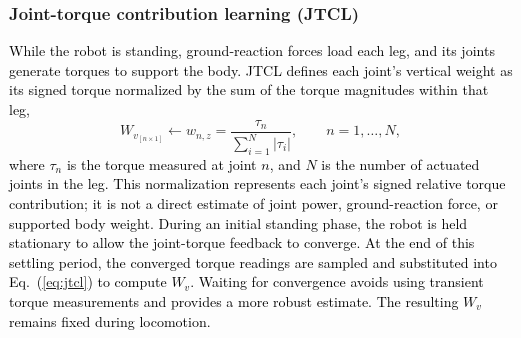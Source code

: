 \documentclass[a4paper, 10pt, conference]{ieeeconf}
\newcommand{\oldtext}[1]{\textcolor{red}{}}
\newcommand{\newtext}[1]{\textcolor{black}{#1}}
\begin{document}
\subsubsection{Joint-torque contribution learning (JTCL)}
\newtext{While the robot is standing, ground-reaction forces load each leg, and
its joints generate torques to support the body. JTCL defines each joint's
vertical weight as its signed torque normalized by the sum of the torque
magnitudes within that leg,}
{\color{black}
\begin{equation}
  W_{v_{[n\times1]}} \leftarrow w_{n,z}
    = \frac{\tau_n}{\sum_{i=1}^{N}|\tau_i|},
    \qquad n=1,\ldots,N,
  \label{eq:jtcl}
\end{equation}
}
\newtext{where $\tau_n$ is the torque measured at joint $n$, and $N$ is the
number of actuated joints in the leg. This normalization represents each joint's
signed relative torque contribution; it is not a direct estimate of joint power,
ground-reaction force, or supported body weight.}
\newtext{During an initial standing phase, the robot is held stationary to allow the joint-torque feedback to converge. At the end of this settling period, the converged torque readings are sampled and substituted
into Eq.~(\ref{eq:jtcl}) to compute $W_v$. Waiting for convergence avoids using
transient torque measurements and provides a more robust estimate. The resulting
$W_v$ remains fixed during locomotion.}
\end{document}
